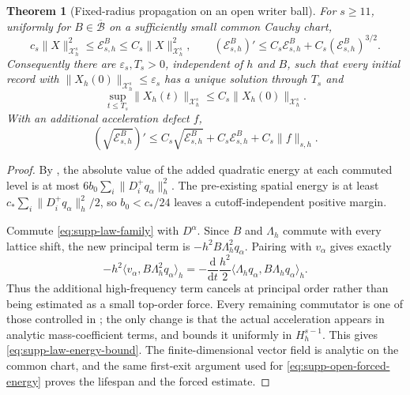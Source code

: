 \documentclass[11pt]{article}
\newtheorem{theorem}{Theorem}[section]
\numberwithin{equation}{section}
\theoremstyle{definition}
\theoremstyle{remark}
\newcommand{\dd}{\mathrm d}
\begin{document}
\begin{theorem}[Fixed-radius propagation on an open writer ball]
\label{thm:supp-law-stability}
For $s\ge11$, uniformly for $B\in\overline{\mathcal B}$ on a sufficiently
small common Cauchy chart,
\begin{equation}
 c_s\|X\|_{\mathcal X_h^s}^2\le\mathscr E^B_{s,h}
 \le C_s\|X\|_{\mathcal X_h^s}^2,
 \qquad
 (\mathscr E^B_{s,h})'\le C_s\mathscr E^B_{s,h}
                     +C_s(\mathscr E^B_{s,h})^{3/2}.
 \label{eq:supp-law-energy-bound}
\end{equation}
Consequently there are $\varepsilon_s,T_s>0$, independent of $h$ and $B$,
such that every initial record with
$\|X_h(0)\|_{\mathcal X_h^s}\le\varepsilon_s$ has a unique solution through
$T_s$ and
\begin{equation}
 \sup_{t\le T_s}\|X_h(t)\|_{\mathcal X_h^s}\le C_s\|X_h(0)\|_{\mathcal X_h^s}.
 \label{eq:supp-law-lifespan}
\end{equation}
With an additional acceleration defect $f$,
\begin{equation}
 (\sqrt{\mathscr E^B_{s,h}})'
 \le C_s\sqrt{\mathscr E^B_{s,h}}+C_s\mathscr E^B_{s,h}+C_s\|f\|_{s,h}.
 \label{eq:supp-law-forced}
\end{equation}
\end{theorem}
\begin{proof}
By , the absolute value of the added quadratic
energy at each commuted level is at most
$6b_0\sum_i\|D_i^+q_\alpha\|_h^2$.  The pre-existing spatial energy is at
least $c_*\sum_i\|D_i^+q_\alpha\|_h^2/2$, so
$b_0<c_*/24$ leaves a cutoff-independent positive margin.

Commute \eqref{eq:supp-law-family} with $D^\alpha$.  Since $B$ and
$\Lambda_h$ commute with every lattice shift, the new principal term is
$-h^2B\Lambda_h^2q_\alpha$.  Pairing with $v_\alpha$ gives exactly
\[
 -h^2\langle v_\alpha,B\Lambda_h^2q_\alpha\rangle_h
 =-\frac{\dd}{\dd t}\frac{h^2}{2}
       \langle\Lambda_hq_\alpha,B\Lambda_hq_\alpha\rangle_h.
\]
Thus the additional high-frequency term cancels at principal order rather
than being estimated as a small top-order force.  Every remaining commutator
is one of those controlled in ; the only change is
that the actual acceleration appears in analytic mass-coefficient terms, and
 bounds it uniformly in $H_h^{s-1}$.  This gives
\eqref{eq:supp-law-energy-bound}.  The finite-dimensional vector field is
analytic on the common chart, and the same first-exit argument used for
\eqref{eq:supp-open-forced-energy} proves the lifespan and the forced estimate.
\end{proof}
\end{document}
